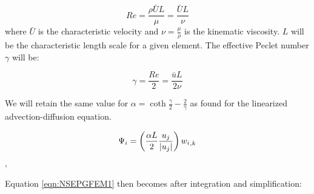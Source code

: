 \begin{equation}
 Re = \frac{\rho\bar{U}L}{\mu}  =\frac{\bar{U}L}{\nu}
\end{equation}
where $\bar{U}$ is the characteristic velocity and $\nu=\frac{\mu}{\rho}$ is the kinematic viscosity. $L$ will be the characteristic length scale for a given element. The effective Peclet number $\gamma$ will be:

\begin{equation}
  \gamma= \frac{Re}{2}  = \frac{\bar{u}L}{2\nu}
\end{equation}

We will retain the same value for $\alpha={\coth{\frac{\gamma}{2}} - \frac{2}{\gamma}}$ as found for the linearized advection-diffusion equation. 

\begin{equation}
 \label{PGTest}
  \Psi_i = \left( \frac{\alpha{L}}{2}{\frac{u_j}{\left| u_j \right|}} \right){ {w_{i}}_{,k} }
\end{equation},


Equation \ref{eqn:NSEPGFEM1} then becomes after integration and simplification:


